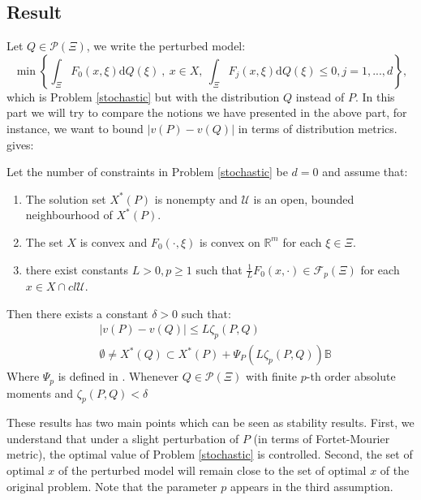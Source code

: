 \documentclass{amsart}
\newcommand{\RR}{\mathbb{R}}
\begin{document}
\subsection{Result}
Let $Q\in\mathcal{P}\left(\Xi\right)$, we write the perturbed model:
\begin{equation*}
    \min\left\{\int_\Xi F_0\left(x,\xi\right)\text{d}Q\left(\xi\right)\:,\: x\in X, \: \int_\Xi F_j\left(x,\xi\right)\text{d}Q\left(\xi\right)\leq0, j=1,...,d\right\},
\end{equation*}
which is Problem \eqref{stochastic} but with the distribution $Q$ instead of $P$. In this part we will try to compare the notions we have presented in the above part, for instance, we want to bound $\lvert v\left(P\right)-v\left(Q\right)\rvert$ in terms of distribution metrics. \cite[Corollary 14]{romisch_stability_2003} gives:
\begin{theorem}\label{stability_th}
    Let the number of constraints in Problem \eqref{stochastic} be $d=0$ and assume that:
    \begin{enumerate}
        \item The  solution set $X^*\left(P\right)$ is nonempty and $\mathcal{U}$ is an open, bounded neighbourhood of $X^*\left(P\right)$.
        \item The set $X$ is convex and $F_0\left(\cdot,\xi\right)$ is convex on $\RR^m$ for each $\xi\in\Xi$.
        \item there exist constants $L>0, p\geq1$ such that $\frac{1}{L}F_0\left(x,\cdot \right)\in\mathcal{F}_p\left(\Xi\right)$ for each $x\in X\cap cl\mathcal{U}$. 
    \end{enumerate}
    Then there exists a constant $\delta>0$ such that:
    \begin{align*}
        &\lvert v\left(P\right)-v\left(Q\right)\rvert \leq L\zeta_p\left(P,Q\right) \\
        & \emptyset \ne X^*\left(Q\right)\subset X^*\left(P\right)+\Psi_P\left(L\zeta_p\left(P,Q\right)\right)\mathbb{B}
    \end{align*}
    Where $\Psi_p$ is defined in \cite[2.22-2.23]{romisch_stability_2003}. Whenever $Q\in\mathcal{P}\left(\Xi\right)$ with finite $p$-th order absolute moments and $\zeta_p\left(P,Q\right)<\delta$
\end{theorem}
These results has two main points which can be seen as stability results. First, we understand that under a slight perturbation of $P$ (in terms of Fortet-Mourier metric), the optimal value of Problem \eqref{stochastic} is controlled. Second, the set of optimal $x$ of the perturbed model will remain close to the set of optimal $x$ of the original problem. Note that the parameter $p$ appears in the third assumption.
\end{document}
